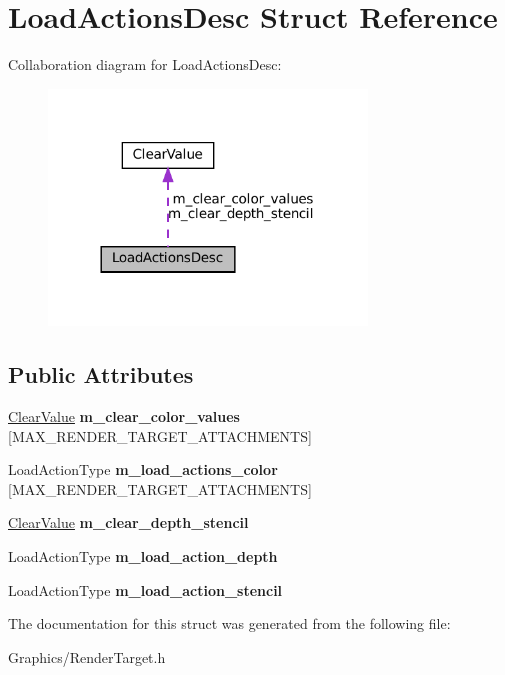 \hypertarget{structLoadActionsDesc}{}\section{Load\+Actions\+Desc Struct Reference}
\label{structLoadActionsDesc}


Collaboration diagram for Load\+Actions\+Desc\+:
\nopagebreak
\begin{figure}[H]
\begin{center}
\leavevmode
\includegraphics[width=240pt]{structLoadActionsDesc__coll__graph}
\end{center}
\end{figure}
\subsection*{Public Attributes}
\begin{DoxyCompactItemize}
\item 
\mbox{\label{structLoadActionsDesc_ae680a023438374892f4841fee504018b}} 
\hyperlink{structClearValue}{Clear\+Value} {\bfseries m\+\_\+clear\+\_\+color\+\_\+values} \mbox{[}M\+A\+X\+\_\+\+R\+E\+N\+D\+E\+R\+\_\+\+T\+A\+R\+G\+E\+T\+\_\+\+A\+T\+T\+A\+C\+H\+M\+E\+N\+TS\mbox{]}
\item 
\mbox{\label{structLoadActionsDesc_a02142788dde339d932f85784a08a95fa}} 
Load\+Action\+Type {\bfseries m\+\_\+load\+\_\+actions\+\_\+color} \mbox{[}M\+A\+X\+\_\+\+R\+E\+N\+D\+E\+R\+\_\+\+T\+A\+R\+G\+E\+T\+\_\+\+A\+T\+T\+A\+C\+H\+M\+E\+N\+TS\mbox{]}
\item 
\mbox{\label{structLoadActionsDesc_a5d76135f4e3ce90d27c0d6b55cceea22}} 
\hyperlink{structClearValue}{Clear\+Value} {\bfseries m\+\_\+clear\+\_\+depth\+\_\+stencil}
\item 
\mbox{\label{structLoadActionsDesc_a034dd585a633b402cfbdbbf971285bb0}} 
Load\+Action\+Type {\bfseries m\+\_\+load\+\_\+action\+\_\+depth}
\item 
\mbox{\label{structLoadActionsDesc_a829e0735a33d6204640b2df537b3c755}} 
Load\+Action\+Type {\bfseries m\+\_\+load\+\_\+action\+\_\+stencil}
\end{DoxyCompactItemize}


The documentation for this struct was generated from the following file\+:\begin{DoxyCompactItemize}
\item 
Graphics/Render\+Target.\+h\end{DoxyCompactItemize}
